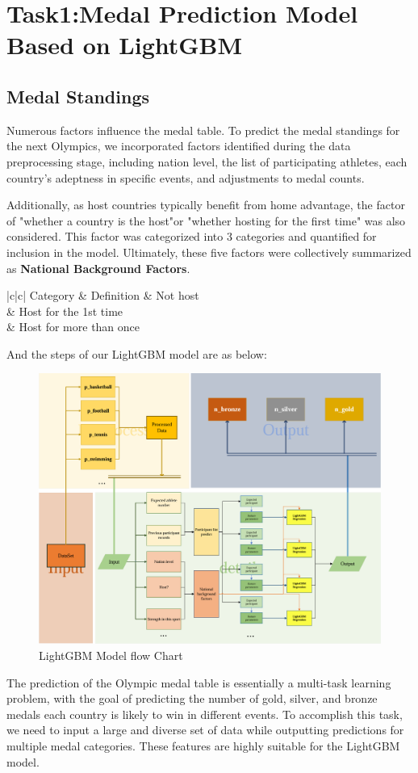 \documentclass[12pt]{article}  %
\begin{document}
\section{Task1:Medal Prediction Model Based on LightGBM}
\subsection{Medal Standings}
Numerous factors influence the medal table. To predict the medal standings for the next Olympics, we incorporated factors identified during the data preprocessing stage, including nation level, the list of participating athletes, each country's adeptness in specific events, and adjustments to medal counts.

Additionally, as host countries typically benefit from home advantage, the factor of "whether a country is the host"or "whether hosting for the first time" was also considered. This factor was categorized into 3 categories and quantified for inclusion in the model. Ultimately, these five factors were collectively summarized as \textbf{National Background Factors}.



\begin{longtable}{|c|c|} 
	\hline
	Category & Definition               \endfirsthead 
	        & Not host                 \\ 
	        & Host for the 1st time    \\ 
	        & Host for more than once  \\
	\hline
\end{longtable}


And the steps of our LightGBM model are as below:
\begin{figure}[htbp]
	\centering
	\includegraphics[width=12cm]{img/xiao.png}
	\caption{LightGBM Model flow Chart}
	\label{fig:aa}
\end{figure}
The prediction of the Olympic medal table is essentially a multi-task learning problem, with the goal of predicting the number of gold, silver, and bronze medals each country is likely to win in different events. To accomplish this task, we need to input a large and diverse set of data while outputting predictions for multiple medal categories. These features are highly suitable for the LightGBM model.
\end{document}
